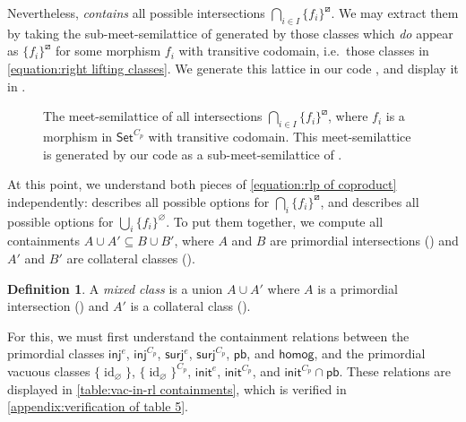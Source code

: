 \documentclass{amsart}
\renewcommand\emptyset\varnothing
\newcommand{\Set}{\mathsf{Set}}
\newcommand{\CpSet}{\Set^{C_p}}
\newcommand{\rlp}[1]{{#1}^{\boxslash}}
\newcommand{\inj}{\mathsf{inj}}
\newcommand{\surj}{\mathsf{surj}}
\newcommand{\init}{\mathsf{init}}
\newcommand{\pb}{\mathsf{pb}}
\newcommand{\homog}{\mathsf{homog}}
\DeclareMathOperator{\id}{id}
\numberwithin{equation}{section}
\theoremstyle{definition}
\newtheorem{definition}[equation]{Definition}
\begin{document}
Nevertheless,  \textit{contains} all possible intersections $\bigcap_{i \in I} \rlp{\{f_i\}}$. We may extract them by taking the sub-meet-semilattice of  generated by those classes which \textit{do} appear as $\rlp{\{f_i\}}$ for some morphism $f_i$ with transitive codomain, i.e.\ those classes in \cref{equation:right lifting classes}. We generate this lattice in our code \cite{code}, and display it in .

\begin{figure}[ph]
	
	\caption{The meet-semilattice of all intersections $\bigcap_{i \in I} \rlp{\{f_i\}}$, where $f_i$ is a morphism in $\CpSet$ with transitive codomain. This meet-semilattice is generated by our code \cite{code} as a sub-meet-semilattice of . }
	\label{figure:transitive_generated_rlcs}
\end{figure}

\bigskip

At this point, we understand both pieces of \cref{equation:rlp of coproduct} independently:   describes all possible options for $\bigcap_i \rlp{\{f_i\}}$, and  describes all possible options for $\bigcup_i \{f_i\}^\emptyset$. To put them together, we compute all containments $A \cup A' \subseteq B \cup B'$, where $A$ and $B$ are primordial intersections () and $A'$ and $B'$ are collateral classes ().

\begin{definition}
	A \textit{mixed class} is a union $A \cup A'$ where $A$ is a primordial intersection () and $A'$ is a collateral class ().
\end{definition}

For this, we must first understand the containment relations between the primordial classes $\inj^e$, $\inj^{C_p}$, $\surj^e$, $\surj^{C_p}$, $\pb$, and $\homog$, and the primordial vacuous classes $\{\id_\emptyset\}$, $\{\id_\emptyset\}^{C_p}$, $\init^e$, $\init^{C_p}$, and $\init^{C_p} \cap \pb$. These relations are displayed in \cref{table:vac-in-rl containments}, which is verified in \cref{appendix:verification of table 5}.


\begin{table}[h]
	\centering
	
	\caption{Containments of the vacuous right-lifting classes $\{\id_\emptyset\}$, $\{\id_\emptyset\}^{C_p}$, $\init^e$, $\init^{C_p}$, and $\init^{C_p} \cap \pb$ inside the classes $\inj^e$, $\inj^{C_p}$, $\surj^e$, $\surj^{C_p}$, $\pb$, and $\homog$. The correctness of this table is verified in \cref{appendix:verification of table 5}.} 
	\label{table:vac-in-rl containments}
\end{table}
\end{document}
